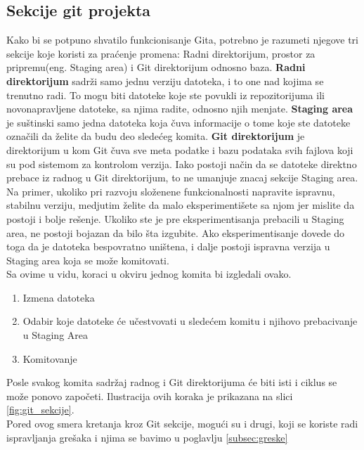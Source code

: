 \documentclass[a4paper]{article}
\begin{document}
{\subsection{Sekcije git projekta}
\label{subsec:sekcije}
Kako bi se potpuno shvatilo funkcionisanje Gita, potrebno je razumeti njegove tri sekcije koje koristi za praćenje promena: Radni direktorijum, prostor za pripremu(eng. Staging area) i Git direktorijum odnosno baza. \textbf{Radni direktorijum} sadrži samo jednu verziju datoteka, i to one nad kojima se trenutno radi. To mogu biti datoteke koje ste povukli iz repozitorijuma ili novonapravljene datoteke, sa njima radite, odnosno njih menjate. \textbf{Staging area} je suštinski samo jedna datoteka koja čuva informacije o tome koje ste datoteke označili da želite da budu deo sledećeg komita. \textbf{Git direktorijum} je direktorijum u kom Git čuva sve meta podatke i bazu podataka svih fajlova koji su pod sistemom za kontrolom verzija. Iako postoji način da se datoteke direktno prebace iz radnog u Git direktorijum, to ne umanjuje znacaj sekcije Staging area. Na primer, ukoliko pri razvoju složenene funkcionalnosti napravite ispravnu, stabilnu verziju, medjutim želite da malo eksperimentišete sa njom jer mislite da postoji i bolje rešenje. Ukoliko ste je pre eksperimentisanja prebacili u Staging area, ne postoji bojazan da bilo šta izgubite. Ako eksperimentisanje dovede do toga da je datoteka bespovratno uništena, i dalje postoji ispravna verzija u Staging area koja se može komitovati.\\
Sa ovime u vidu, koraci u okviru jednog komita bi izgledali ovako.
\begin{enumerate}
\item Izmena datoteka
\item Odabir koje datoteke će učestvovati u sledećem komitu i njihovo prebacivanje u Staging Area
\item Komitovanje
\end{enumerate}

Posle svakog komita sadržaj radnog i Git direktorijuma će biti isti i ciklus se može ponovo započeti. Ilustracija ovih koraka je prikazana na slici \ref{fig:git_sekcije}.\\
Pored ovog smera kretanja kroz Git sekcije, mogući su i drugi, koji se koriste radi ispravljanja grešaka i njima se bavimo u poglavlju \ref{subsec:greske}

}
\end{document}
